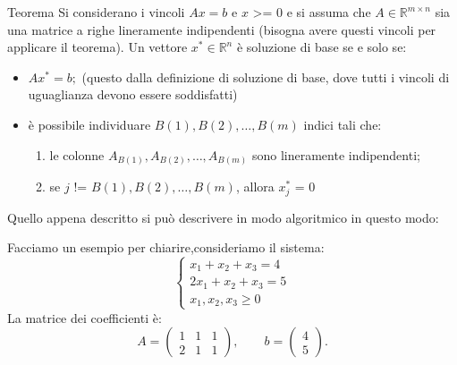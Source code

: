 \begin{theorem}{Teorema}
    Si considerano i vincoli $Ax = b$ e $x$ >= 0 e si assuma che $A \in \mathbb{R}^{m \times n}$ sia una matrice a righe lineramente indipendenti (bisogna avere questi vincoli per applicare il teorema).
    Un vettore $x^* \in \mathbb{R}^n$ è soluzione di base se e solo se:
    \begin{itemize}
        \item $A x^* = b;$ (questo dalla definizione di soluzione di base, dove tutti i vincoli di uguaglianza devono essere soddisfatti)
        \item è possibile individuare $B(1),B(2),\dots,B(m)$ indici tali che:
        \begin{enumerate}
            \item le colonne $A_{B(1)},A_{B(2)},\dots,A_{B(m)}$ sono lineramente indipendenti;
            \item se $j$ != $B(1),B(2),\dots,B(m)$, allora $x^*_j$ = 0
        \end{enumerate}
    \end{itemize}
\end{theorem}
\label{teorema SBA}
Quello appena descritto si può descrivere in modo algoritmico in questo modo:
\begin{center}
\end{center}
Facciamo un esempio per chiarire,consideriamo il sistema:
\[
\begin{cases}
x_1+x_2+x_3=4\\
2x_1+x_2+x_3=5\\
x_1,x_2,x_3\geq 0
\end{cases}
\]
La matrice dei coefficienti è:
\[
A=
\begin{pmatrix}
1&1&1\\
2&1&1
\end{pmatrix},
\qquad
b=\begin{pmatrix}4\\5\end{pmatrix}.
\]

